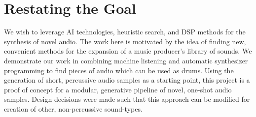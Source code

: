 \documentclass[\main/thesis.tex]{subfiles}
\begin{document}
\section{Restating the Goal}
We wish to leverage AI technologies, heuristic search, and DSP methods for the synthesis of novel audio. The work here is motivated by the idea of finding new, convenient methods for the expansion of a music producer's library of sounds. We demonstrate our work in combining machine listening and automatic synthesizer programming to find pieces of audio which can be used as drums. Using the generation of short, percussive audio samples as a starting point, this project is a proof of concept for a modular, generative pipeline of novel, one-shot audio samples. Design decisions were made such that this approach can be modified for creation of other, non-percussive sound-types. 
\end{document}
